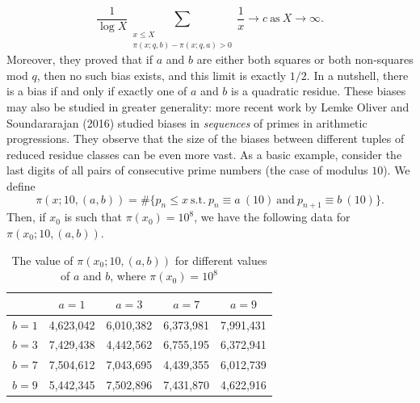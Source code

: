 \begin{equation}
    \frac{1}{\log X} \sum_{\substack{x \leq X \\ \pi(x; q, b) - \pi(x; q, a) > 0}} \frac{1}{x} \rightarrow c \ \textrm{as} \ X \rightarrow \infty. \nonumber
\end{equation}
Moreover, they proved that if $a$ and $b$ are either both squares or both non-squares mod $q$, then no such bias exists, and this limit is exactly $1/2$. In a nutshell, there is a bias if and only if exactly one of $a$ and $b$ is a quadratic residue. These biases may also be studied in greater generality: more recent work by Lemke Oliver and Soundararajan (2016) \cite{LemkeOliverE4446} studied biases in \textit{sequences} of primes in arithmetic progressions. They observe that the size of the biases between different tuples of reduced residue classes can be even more vast. As a basic example, consider the last digits of all pairs of consecutive prime numbers (the case of modulus $10$). We define
\begin{equation}
    \pi(x; 10, (a, b)) = \#\{p_n \leq x \ \textrm{s.t.} \ p_n \equiv a \ (10) \ \textrm{and} \ p_{n+1} \equiv b \ (10) \}. \nonumber
\end{equation}
Then, if $x_0$ is such that $\pi(x_0) = 10^{8}$, we have the following data for $\pi(x_0; 10, (a, b))$.
\begin{table}[H]
    \centering
    \begin{tabular}{|c|c|c|c|c|}
    \hline
        & $a=1$ & $a=3$ & $a=7$ & $a=9$ \\
        \hline
        $b=1$ & 4,623,042 & 6,010,382 & 6,373,981 & 7,991,431  \\
        \hline
        $b=3$ & 7,429,438 & 4,442,562 & 6,755,195 &  6,372,941  \\
        \hline
        $b=7$ & 7,504,612 & 7,043,695 & 4,439,355 &  6,012,739  \\
        \hline
        $b=9$ & 5,442,345 & 7,502,896 & 7,431,870 &  4,622,916  \\
        \hline
    \end{tabular}
    \caption{The value of $\pi(x_0; 10, (a, b))$ for different values of $a$ and $b$, where $\pi(x_0) = 10^{8}$}
\end{table}

